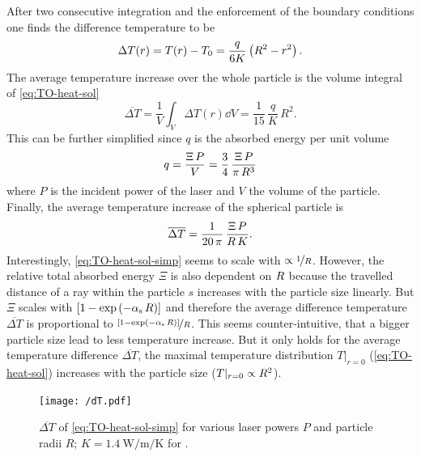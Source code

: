 After two consecutive integration and the enforcement of the boundary 
conditions one finds the difference temperature to be
\begin{equation}
 \Delta T(r) = T(r) - T_{0} = \frac{q}{6K}\left(R^2 - r^{2} \right).
  \label{eq:TO-heat-sol}
\end{equation}
The average temperature increase over the whole particle is the volume integral 
of \cref{eq:TO-heat-sol}
\begin{equation}
  \overline{\Delta T} = \frac{1}{V}\int_{V}\Delta T(r) \dd{V} = 
  \frac{1}{15}\,\frac{q}{K}\,R^{2}.
  \label{eq:TO-heat-avg}
\end{equation}
This can be further simplified since $q$ is the absorbed energy per unit volume
\begin{equation}
  q = \frac{\Xi\,P}{V} = \frac{3}{4}\,\frac{\Xi\,P}{\pi\,R^{3}}
\end{equation}
where $P$ is the incident power of the laser and $V$ the volume of the 
particle. Finally, the average temperature increase of the spherical particle 
is
\begin{equation}
  \overline{\Delta T} = \frac{1}{20\,\pi}\,\frac{\Xi\,P}{R\,K}.
  \label{eq:TO-heat-sol-simp}
\end{equation}
Interestingly, \cref{eq:TO-heat-sol-simp} seems to scale with $\propto 
\nicefrac{1}{R}$. However, the relative total absorbed energy $\Xi$ is also 
dependent on $R$ because the travelled distance of a ray within the 
particle $s$ increases with the particle size linearly. But $\Xi$ scales with 
$\left[  1-\exp\left( -\alpha_{\mathrm{s}}\,R \right)\right]$ and therefore the 
average difference temperature $\overline{\Delta T}$ is proportional to 
$\nicefrac{\left[ 1-\exp\left( -\alpha_{\mathrm{s}}\,R \right) \right]}{R}$. This 
seems counter-intuitive, that a bigger particle size lead to less temperature 
increase. But it only holds for the average temperature difference 
$\overline{\Delta T}$, the maximal temperature distribution $T\vert_{r=0}$ 
(\cref{eq:TO-heat-sol}) increases with the particle size 
($T\vert_{r=0}\propto R^{2}$).

\begin{figure}[tbp]
  \centering
  \texttt{[image: /dT.pdf]}
  \caption{$\overline{\Delta T}$ of \cref{eq:TO-heat-sol-simp} for various 
  laser powers $P$ and particle radii $R$; 
$K=\SI{1.4}{\watt\per\meter\per\kelvin}$ for \SiO.}
  \label{fig:TO-dT}
\end{figure}

